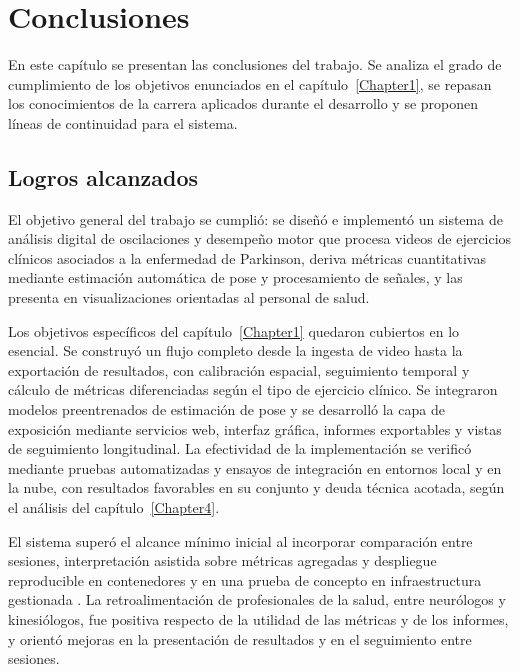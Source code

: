 
\chapter{Conclusiones}

\label{Chapter5}

En este capítulo se presentan las conclusiones del trabajo. Se analiza el grado de cumplimiento de los objetivos enunciados en el capítulo~\ref{Chapter1}, se repasan los conocimientos de la carrera aplicados durante el desarrollo y se proponen líneas de continuidad para el sistema.


\section{Logros alcanzados}

El objetivo general del trabajo se cumplió: se diseñó e implementó un sistema de análisis digital de oscilaciones y desempeño motor que procesa videos de ejercicios clínicos asociados a la enfermedad de Parkinson, deriva métricas cuantitativas mediante estimación automática de pose y procesamiento de señales, y las presenta en visualizaciones orientadas al personal de salud.

Los objetivos específicos del capítulo~\ref{Chapter1} quedaron cubiertos en lo esencial. Se construyó un flujo completo desde la ingesta de video hasta la exportación de resultados, con calibración espacial, seguimiento temporal y cálculo de métricas diferenciadas según el tipo de ejercicio clínico. Se integraron modelos preentrenados de estimación de pose y se desarrolló la capa de exposición mediante servicios web, interfaz gráfica, informes exportables y vistas de seguimiento longitudinal. La efectividad de la implementación se verificó mediante pruebas automatizadas y ensayos de integración en entornos local y en la nube, con resultados favorables en su conjunto y deuda técnica acotada, según el análisis del capítulo~\ref{Chapter4}.

El sistema superó el alcance mínimo inicial al incorporar comparación entre sesiones, interpretación asistida sobre métricas agregadas y despliegue reproducible en contenedores y en una prueba de concepto en infraestructura gestionada \citep{gcp,merkel2014docker}. La retroalimentación de profesionales de la salud, entre neurólogos y kinesiólogos, fue positiva respecto de la utilidad de las métricas y de los informes, y orientó mejoras en la presentación de resultados y en el seguimiento entre sesiones.

